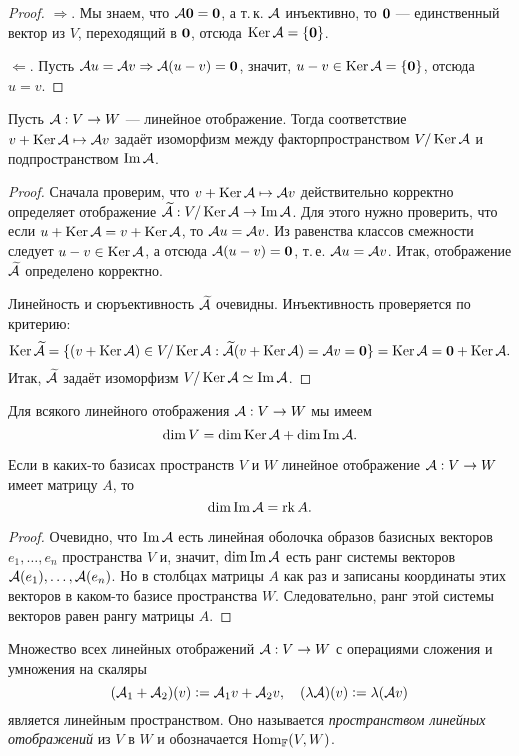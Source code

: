 \begin{proof}
    $\Rightarrow$. Мы знаем, что $\mathcal{A}\boldsymbol{0} = \boldsymbol{0}$, а т.\,к. $\mathcal{A}$ инъективно, то $\boldsymbol{0}$ --- единственный вектор из $V$, переходящий в $\boldsymbol{0}$, отсюда $\operatorname{Ker}\mathcal{A} = \{\boldsymbol{0}\}$.

    $\Leftarrow$. Пусть $\mathcal{A} u = \mathcal{A} v \Rightarrow \mathcal{A}(u - v) = \boldsymbol{0}$, значит, $u - v \in \operatorname{Ker}\mathcal{A} = \{\boldsymbol{0}\}$, отсюда $u = v$.
\end{proof}

\begin{theorem}
    Пусть $\mathcal{A}: V \to W$ --- линейное отображение. Тогда соответствие $v + \operatorname{Ker}\mathcal{A} \mapsto \mathcal{A} v$ задаёт изоморфизм между факторпространством $V / \operatorname{Ker}\mathcal{A}$ и подпространством $\operatorname{Im}\mathcal{A}$.
\end{theorem}

\begin{proof}
    Сначала проверим, что $v + \operatorname{Ker}\mathcal{A} \mapsto \mathcal{A} v$ действительно корректно определяет отображение $\widetilde{\mathcal{A}}: V / \operatorname{Ker}\mathcal{A} \to \operatorname{Im}\mathcal{A}$. Для этого нужно проверить, что если $u + \operatorname{Ker}\mathcal{A} = v + \operatorname{Ker}\mathcal{A}$, то $\mathcal{A} u = \mathcal{A} v$. Из равенства классов смежности следует $u - v \in \operatorname{Ker}\mathcal{A}$, а отсюда $\mathcal{A}(u - v) = \boldsymbol{0}$, т.\,е. $\mathcal{A} u = \mathcal{A} v$. Итак, отображение $\widetilde{\mathcal{A}}$ определено корректно.

    Линейность и сюръективность $\widetilde{\mathcal{A}}$ очевидны. Инъективность проверяется по критерию: \[\operatorname{Ker}\widetilde{\mathcal{A}} = \{(v + \operatorname{Ker}\mathcal{A}) \in V / \operatorname{Ker}\mathcal{A} : \widetilde{\mathcal{A}}(v + \operatorname{Ker}\mathcal{A}) = \mathcal{A} v = \boldsymbol{0}\} = \operatorname{Ker}\mathcal{A} = \boldsymbol{0} + \operatorname{Ker}\mathcal{A}.\] Итак, $\widetilde{\mathcal{A}}$ задаёт изоморфизм $V / \operatorname{Ker}\mathcal{A} \simeq \operatorname{Im}\mathcal{A}$.
\end{proof}

\begin{corollary}
    Для всякого линейного отображения $\mathcal{A}: V \to W$ мы имеем \[\dim V = \dim\operatorname{Ker}\mathcal{A} + \dim\operatorname{Im}\mathcal{A}.\]
\end{corollary}

\begin{proposal}
    Если в каких-то базисах пространств $V$ и $W$ линейное отображение $\mathcal{A}: V \to W$ имеет матрицу $A$, то
    \[
        \dim\operatorname{Im}\mathcal{A} = \operatorname{rk} A.
    \]
\end{proposal}

\begin{proof}
    Очевидно, что $\operatorname{Im}\mathcal{A}$ есть линейная оболочка образов базисных векторов $e_1, \ldots, e_n$ пространства $V$ и, значит, $\dim\operatorname{Im}\mathcal{A}$ есть ранг системы векторов $\mathcal{A}(e_1), \ldots, \mathcal{A}(e_n)$. Но в столбцах матрицы $A$ как раз и записаны координаты этих векторов в каком-то базисе пространства $W$. Следовательно, ранг этой системы векторов равен рангу матрицы $A$.
\end{proof}

\begin{definition}
    Множество всех линейных отображений $\mathcal{A}: V \to W$ с операциями сложения и умножения на скаляры
    \[
        (\mathcal{A}_1 + \mathcal{A}_2)(v) \vcentcolon = \mathcal{A}_1v + \mathcal{A}_2v,\quad (\lambda\mathcal{A})(v) \vcentcolon = \lambda(\mathcal{A} v)
    \]
    является линейным пространством. Оно называется \textit{пространством линейных отображений} из $V$ в $W$ и обозначается $\operatorname{Hom}_{\mathbb{F}}(V, W)$.
\end{definition}


